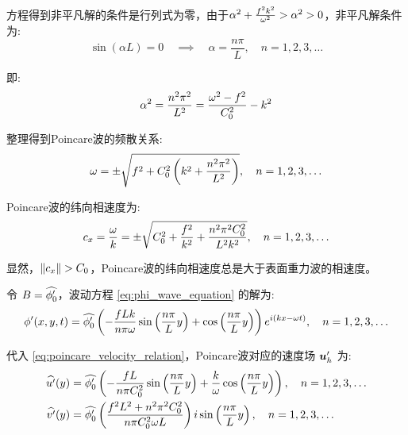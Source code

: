 方程得到非平凡解的条件是行列式为零，由于$\alpha^2 + \frac{f^2 k^2}{\omega^2} > \alpha^2 > 0$，非平凡解条件为:
\begin{equation*}
    \sin(\alpha L) = 0 \quad \implies \quad \alpha = \frac{n\pi}{L}, \quad n = 1, 2, 3, \ldots
\end{equation*}

即:
\begin{equation*}
    \alpha^2 = \frac{n^2\pi^2}{L^2} = \frac{\omega^2 - f^2}{C_0^2} - k^2
\end{equation*}

整理得到Poincare波的频散关系:
\begin{equation}
    \omega = \pm \sqrt{f^2 + C_0^2 \left(k^2 + \frac{n^2\pi^2}{L^2}\right)}, \quad n = 1, 2, 3, \ldots
    \label{eq:poincare_dispersion}
\end{equation}

Poincare波的纬向相速度为:
\begin{equation}
    c_x = \frac{\omega}{k} = \pm \sqrt{C_0^2 + \frac{f^2}{k^2} + \frac{n^2 \pi^2 C_0^2}{L^2 k^2}}, \quad n = 1, 2, 3, \ldots
    \label{eq:poincare_wavespeed}
\end{equation}

显然，$\lVert c_x \rVert > C_0$，Poincare波的纬向相速度总是大于表面重力波的相速度。

令 $B = \widehat{\phi_0^\prime}$，波动方程 \eqref{eq:phi_wave_equation} 的解为:
\begin{equation}
    \phi^\prime(x, y, t) = \widehat{\phi_0^\prime} \left(-\frac{f L k}{n\pi \omega} \sin\left(\frac{n\pi}{L} y\right) + \cos\left(\frac{n\pi}{L} y\right)\right) e^{i (k x - \omega t)}, \quad n = 1, 2, 3, \ldots
    \label{eq:wave_solution_poincare}
\end{equation}

代入 \eqref{eq:poincare_velocity_relation}，Poincare波对应的速度场 $\bm{u}_h^\prime$ 为:
\begin{align}
    \widehat{u^\prime}(y) &= \widehat{\phi_0^\prime} \left(-\frac{f L}{n\pi C_0^2} \sin\left(\frac{n\pi}{L} y\right) + \frac{k}{\omega}\cos\left(\frac{n\pi}{L} y\right)\right), \quad n = 1, 2, 3, \ldots \label{eq:u_solution_poincare} \\
    \widehat{v^\prime}(y) &= \widehat{\phi_0^\prime} \left(\frac{f^2 L^2 + n^2 \pi^2 C_0^2}{n\pi C_0^2 \omega L}\right) i \sin\left(\frac{n\pi}{L} y\right), \quad n = 1, 2, 3, \ldots \label{eq:v_solution_poincare}
\end{align}

